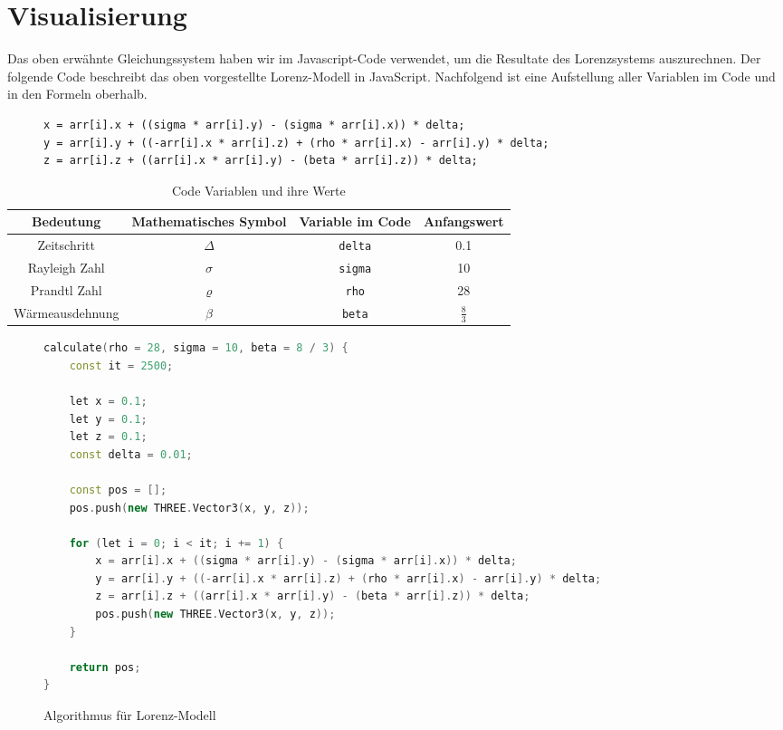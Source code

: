 
\section{Visualisierung}\label{visualisierung}
Das oben erwähnte Gleichungssystem haben wir im Javascript-Code verwendet, um die Resultate des Lorenzsystems auszurechnen. Der folgende Code beschreibt das oben vorgestellte Lorenz-Modell in JavaScript. Nachfolgend ist eine Aufstellung aller Variablen im Code und in den Formeln oberhalb.

\begin{figure}
	\begin{lstlisting}[style=C]
x = arr[i].x + ((sigma * arr[i].y) - (sigma * arr[i].x)) * delta;
y = arr[i].y + ((-arr[i].x * arr[i].z) + (rho * arr[i].x) - arr[i].y) * delta;
z = arr[i].z + ((arr[i].x * arr[i].y) - (beta * arr[i].z)) * delta;
		\end{lstlisting}
\end{figure}

	\begin{table}[]
		\centering
		\begin{tabular}{| c | c | c | c |}
			\hline
			\textbf{Bedeutung} & \textbf{Mathematisches Symbol} & \textbf{Variable im Code} & \textbf{Anfangswert}\\\hline
			Zeitschritt & $ \Delta $ & \texttt{delta} & 0.1 \\\hline
			Rayleigh Zahl & $ \sigma $ & \texttt{sigma} & 10 \\\hline
			Prandtl Zahl & $\varrho $ & \texttt{rho} & 28 \\\hline
			Wärmeausdehnung & $\beta $ & \texttt{beta}  & $ \frac{8}{3} $ \\\hline
		\end{tabular}
		\caption{Code Variablen und ihre Werte\label{CodeVariablen}}
	\end{table}

\begin{figure}
	\begin{lstlisting}[style=C, language=C++]
calculate(rho = 28, sigma = 10, beta = 8 / 3) {
	const it = 2500;
	
	let x = 0.1;
	let y = 0.1;
	let z = 0.1;
	const delta = 0.01;
	
	const pos = [];
	pos.push(new THREE.Vector3(x, y, z));
	
	for (let i = 0; i < it; i += 1) {
		x = arr[i].x + ((sigma * arr[i].y) - (sigma * arr[i].x)) * delta;
		y = arr[i].y + ((-arr[i].x * arr[i].z) + (rho * arr[i].x) - arr[i].y) * delta;
		z = arr[i].z + ((arr[i].x * arr[i].y) - (beta * arr[i].z)) * delta;
		pos.push(new THREE.Vector3(x, y, z));
	}
	
	return pos;
}
		\end{lstlisting}
		\caption{Algorithmus für Lorenz-Modell\label{AlgorithmusLorenz}}
\end{figure}

